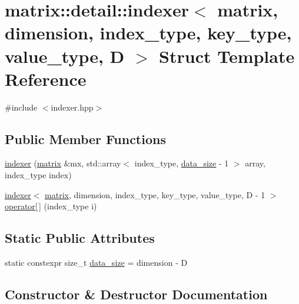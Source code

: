\hypertarget{structmatrix_1_1detail_1_1indexer}{}\section{matrix\+:\+:detail\+:\+:indexer$<$ matrix, dimension, index\+\_\+type, key\+\_\+type, value\+\_\+type, D $>$ Struct Template Reference}
\label{structmatrix_1_1detail_1_1indexer}


{\ttfamily \#include $<$indexer.\+hpp$>$}

\subsection*{Public Member Functions}
\begin{DoxyCompactItemize}
\item 
\hyperlink{structmatrix_1_1detail_1_1indexer_aa76a16eaa999aa0aa653873c85829fc6}{indexer} (\hyperlink{structmatrix_1_1matrix}{matrix} \&mx, std\+::array$<$ index\+\_\+type, \hyperlink{structmatrix_1_1detail_1_1indexer_ad253e4bd5e3639bcf8fdf64a94e796b1}{data\+\_\+size} -\/ 1 $>$ array, index\+\_\+type index)
\item 
\hyperlink{structmatrix_1_1detail_1_1indexer}{indexer}$<$ \hyperlink{structmatrix_1_1matrix}{matrix}, dimension, index\+\_\+type, key\+\_\+type, value\+\_\+type, D -\/ 1 $>$ \hyperlink{structmatrix_1_1detail_1_1indexer_aa1fc587fbe311991cdd03613c0acf57a}{operator\mbox{[}$\,$\mbox{]}} (index\+\_\+type i)
\end{DoxyCompactItemize}
\subsection*{Static Public Attributes}
\begin{DoxyCompactItemize}
\item 
static constexpr size\+\_\+t \hyperlink{structmatrix_1_1detail_1_1indexer_ad253e4bd5e3639bcf8fdf64a94e796b1}{data\+\_\+size} = dimension -\/ D
\end{DoxyCompactItemize}


\subsection{Constructor \& Destructor Documentation}
\mbox{\label{structmatrix_1_1detail_1_1indexer_aa76a16eaa999aa0aa653873c85829fc6}} 
